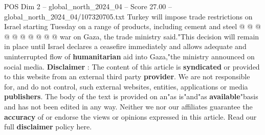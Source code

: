 \begin{textsample}{POS Dim 2 – global\_north\_2024\_04 – Score 27.00 – global\_north\_2024\_04/107320705.txt}
Turkey will impose trade restrictions on Israel starting Tuesday on a range of products, including cement and steel @ @ @ @ @ @ @ @ @ @ war on Gaza, the trade ministry said."This decision will remain in place until Israel declares a ceasefire immediately and allows adequate and uninterrupted flow of \textbf{humanitarian} aid into Gaza,"the ministry announced on social media. \textbf{Disclaimer} : The content of this article is \textbf{syndicated} or provided to this website from an external third party \textbf{provider}.
We are not responsible for, and do not control, such external websites, entities, applications or media \textbf{publishers}.
The body of the text is provided on an"as is"and"as \textbf{available}"basis and has not been edited in any way.
Neither we nor our affiliates guarantee the \textbf{accuracy} of or endorse the views or opinions expressed in this article.
Read our full \textbf{disclaimer} policy here.

\end{textsample}
